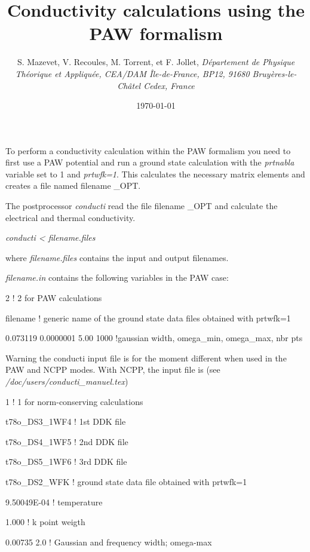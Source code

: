 \documentclass{article}
\begin{document}
%
\title{Conductivity calculations using the PAW formalism }

\author{S. Mazevet, V. Recoules, M. Torrent, et F. Jollet,
{\it D\'epartement de Physique Th\'eorique et Appliqu\'ee,
CEA/DAM \^Ile-de-France,
BP12, 91680 Bruy\`eres-le-Ch\^atel Cedex, France}}

\date{\today}

\vspace{0.5cm}
To perform a conductivity calculation within the PAW formalism you need to first use
a PAW potential and run a ground state calculation with the \textit{prtnabla} variable
 set to 1 and \textit{prtwfk=1}.
This calculates the necessary matrix elements and creates a file named filename \_OPT.

The postprocessor \textit{conducti} read the file filename \_OPT and calculate
the electrical and thermal conductivity.

\textit{conducti < filename.files}

where \textit{filename.files} contains the input and output filenames.
\vspace{0.25cm}

\textit{filename.in} contains the following variables in the PAW case:


2            ! 2 for PAW calculations


filename     ! generic name of the ground state data files obtained with   prtwfk=1


0.073119 0.0000001 5.00 1000   !gaussian width, omega\_min, omega\_max, nbr pts
\vspace{0.5cm}

Warning the conducti input file is for the moment different when used in the
PAW and NCPP modes. With NCPP, the input file is (see \textit{/doc/users/conducti\_manuel.tex})




1                 ! 1 for norm-conserving calculations


t78o\_DS3\_1WF4 ! 1st DDK file


t78o\_DS4\_1WF5 ! 2nd DDK file


t78o\_DS5\_1WF6 ! 3rd DDK file


t78o\_DS2\_WFK  ! ground state data file obtained with   prtwfk=1


9.50049E-04   ! temperature


1.000         ! k point weigth


0.00735  2.0  ! Gaussian and frequency width; omega-max
\end{document}
